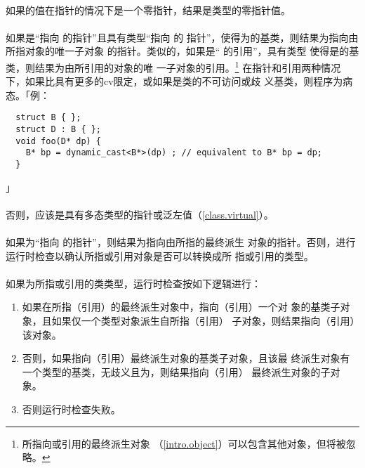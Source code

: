 \paragraph{}
如果的值在指针的情况下是一个零指针，结果是类型的零指针值。

\paragraph{}
如果是``指向 的指针''且具有类型``指向 的
指针''，使得为的基类，则结果为指向由所指对象的唯一子对象
的指针。类似的，如果是`` 的引用''，具有类型
 使得是的基类，则结果为由所引用的对象的唯
一子对象的引用。\footnote{所指向或引用的最终派生对象
（\ref{intro.object}）可以包含其他对象，但将被忽略。} 在指针和引用两种情况
下，如果比具有更多的cv限定，或如果是类的不可访问或歧
义基类，则程序为病态。「例：
\begin{lstlisting}
  struct B { };
  struct D : B { };
  void foo(D* dp) {
    B* bp = dynamic_cast<B*>(dp) ; // equivalent to B* bp = dp;
  }
\end{lstlisting}」

\paragraph{}
否则，应该是具有多态类型的指针或泛左值（\ref{class.virtual}）。

\paragraph{}
如果为``指向 的指针''，则结果为指向由所指的最终派生
对象的指针。否则，进行运行时检查以确认所指或引用对象是否可以转换成所
指或引用的类型。

\paragraph{}
如果为所指或引用的类类型，运行时检查按如下逻辑进行：
\begin{enumerate}
  \item{如果在所指（引用）的最终派生对象中，指向（引用）一个对
    象的基类子对象，且如果仅一个类型对象派生自所指（引用）
    子对象，则结果指向（引用）该对象。}
  \item{否则，如果指向（引用）最终派生对象的基类子对象，且该最
    终派生对象有一个类型的基类，无歧义且为，则结果指向（引用）
    最终派生对象的子对象。}
  \item{否则运行时检查失败。}
\end{enumerate}

